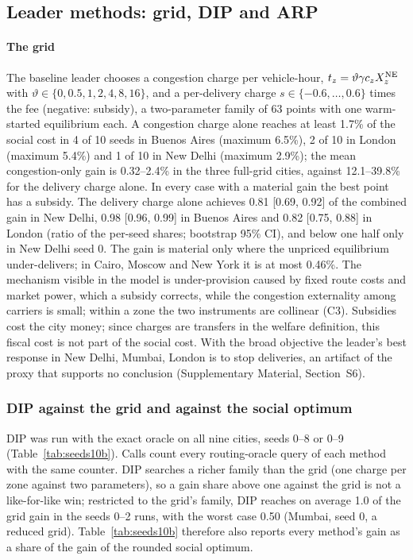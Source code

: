 \documentclass[preprint,11pt]{elsarticle}
\theoremstyle{definition}
\theoremstyle{remark}
\newcommand{\SM}[1]{Supplementary Material, Section~#1}
\begin{document}
\subsection{Leader methods: grid, DIP and ARP}\label{sec:res-leader}

\paragraph{The grid} The baseline leader chooses a congestion charge per vehicle-hour, $t_z=\vartheta\gamma c_zX_z^{\rm NE}$ with $\vartheta\in\{0,0.5,1,2,4,8,16\}$, and a per-delivery charge $s\in\{-0.6,\dots,0.6\}$ times the fee (negative: subsidy), a two-parameter family of 63 points with one warm-started equilibrium each. A congestion charge alone reaches at least 1.7\% of the social cost in 4 of 10 seeds in Buenos Aires (maximum 6.5\%), 2 of 10 in London (maximum 5.4\%) and 1 of 10 in New Delhi (maximum 2.9\%); the mean congestion-only gain is 0.32--2.4\% in the three full-grid cities, against 12.1--39.8\% for the delivery charge alone. In every case with a material gain the best point has a subsidy. The delivery charge alone achieves 0.81 [0.69, 0.92] of the combined gain in New Delhi, 0.98 [0.96, 0.99] in Buenos Aires and 0.82 [0.75, 0.88] in London (ratio of the per-seed shares; bootstrap 95\% CI), and below one half only in New Delhi seed 0. The gain is material only where the unpriced equilibrium under-delivers; in Cairo, Moscow and New York it is at most 0.46\%. The mechanism visible in the model is under-provision caused by fixed route costs and market power, which a subsidy corrects, while the congestion externality among carriers is small; within a zone the two instruments are collinear (C3). Subsidies cost the city money; since charges are transfers in the welfare definition, this fiscal cost is not part of the social cost. With the broad objective the leader's best response in New Delhi, Mumbai, London is to stop deliveries, an artifact of the proxy that supports no conclusion (\SM{S6}).

\subsubsection{DIP against the grid and against the social optimum}\label{sec:res-dip}

DIP was run with the exact oracle on all nine cities, seeds 0--8 or 0--9 (Table~\ref{tab:seeds10b}). Calls count every routing-oracle query of each method with the same counter. DIP searches a richer family than the grid (one charge per zone against two parameters), so a gain share above one against the grid is not a like-for-like win; restricted to the grid's family, DIP reaches on average 1.0 of the grid gain in the seeds 0--2 runs, with the worst case 0.50 (Mumbai, seed 0, a reduced grid). Table~\ref{tab:seeds10b} therefore also reports every method's gain as a share of the gain of the rounded social optimum.
\end{document}
